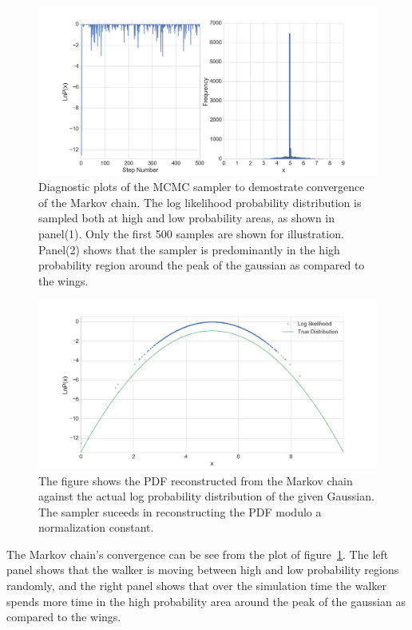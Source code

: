 \documentclass[12pt,usletter,english]{article}
\begin{document}
\begin{figure}[!h]
  \centering \includegraphics[width=15cm]{diagnostics.png}
  \caption{Diagnostic plots of the MCMC sampler to demostrate
    convergence of the Markov chain. The log likelihood probability
    distribution is sampled both at high and low probability areas, as
    shown in panel(1). Only the first 500 samples are shown for
    illustration. Panel(2) shows that the sampler is predominantly in
    the high probability region around the peak of the gaussian as
    compared to the wings.
    \label{fig:diagnostics}}
\end{figure}

\begin{figure}[!h]
  \centering \includegraphics[width=15cm]{dist_mcmc.png}
  \caption{The figure shows the PDF reconstructed from the Markov
    chain against the actual log probability distribution of the given
    Gaussian. The sampler suceeds in reconstructing the PDF modulo a
    normalization constant.
    \label{fig:hist}}
\end{figure}

The Markov chain's convergence can be see from the plot of
figure~\ref{fig:diagnostics}. The left panel shows that the walker is
moving between high and low probability regions randomly, and the
right panel shows that over the simulation time the walker spends more
time in the high probability area around the peak of the gaussian as
compared to the wings.
\end{document}
